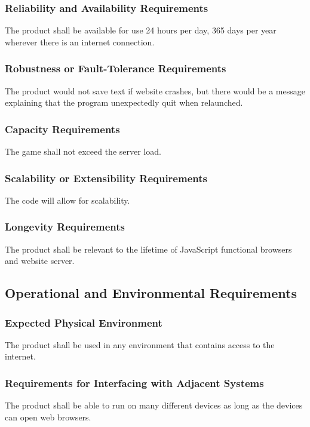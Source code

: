 \documentclass[12pt, titlepage]{article}
\begin{document}
\subsubsection{Reliability and Availability Requirements}
The product shall be available for use 24 hours per day, 365 days per year wherever there is an internet connection.


\subsubsection{Robustness or Fault-Tolerance Requirements}
The product would not save text if website crashes, but there would be a message explaining that the program unexpectedly quit when relaunched.


\subsubsection{Capacity Requirements}
The game shall not exceed the server load.


\subsubsection{Scalability or Extensibility Requirements}
The code will allow for scalability.


\subsubsection{Longevity Requirements}
The product shall be relevant to the lifetime of JavaScript functional browsers and website server.

\subsection{Operational and Environmental Requirements}
\subsubsection*{Expected Physical Environment}
The product shall be used in any environment that contains access to the internet.


\subsubsection{Requirements for Interfacing with Adjacent Systems}
The product shall be able to run on many different devices as long as the devices can open web browsers.
\end{document}
